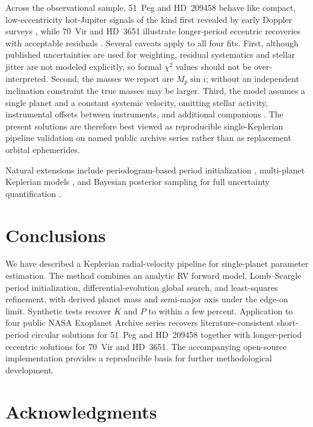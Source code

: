 \documentclass[11pt]{article}
\begin{document}
Across the observational sample, 51~Peg and HD~209458 behave like compact,
low-eccentricity hot-Jupiter signals of the kind first revealed by early Doppler
surveys \citep{mayor1995jupiter,marcy1997peg}, while 70~Vir and HD~3651
illustrate longer-period eccentric recoveries with acceptable residuals
\citep{marcy1996planet,butler2006catalog}. Several caveats apply to all four
fits. First, although published uncertainties are used for weighting, residual
systematics and stellar jitter are not modeled explicitly, so formal $\chi^2$
values should not be over-interpreted. Second, the masses we report are
$M_p\sin i$; without an independent inclination constraint the true masses may
be larger. Third, the model assumes a single planet and a constant systemic
velocity, omitting stellar activity, instrumental offsets between instruments,
and additional companions \citep{fischer2014exoplanet}. The present solutions
are therefore best viewed as reproducible single-Keplerian pipeline validation
on named public archive series rather than as replacement orbital ephemerides.

Natural extensions include periodogram-based period initialization
\citep{cumming2004detectability}, multi-planet Keplerian models
\citep{wright2009efficient}, and Bayesian posterior sampling for full
uncertainty quantification \citep{ford2005quantifying}.

\section{Conclusions}

We have described a Keplerian radial-velocity pipeline for single-planet
parameter estimation. The method combines an analytic RV forward model,
Lomb--Scargle period initialization, differential-evolution global search, and
least-squares refinement, with derived planet mass and semi-major axis under
the edge-on limit. Synthetic tests recover $K$ and $P$ to within a few percent.
Application to four public NASA Exoplanet Archive series recovers
literature-consistent short-period circular solutions for 51~Peg and HD~209458
together with longer-period eccentric solutions for 70~Vir and HD~3651. The
accompanying open-source implementation provides a reproducible basis for
further methodological development.

\section*{Acknowledgments}
\end{document}
